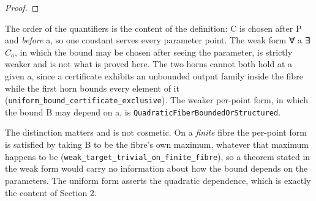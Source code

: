 \begin{proof}
\end{proof}

The order of the quantifiers is the content of the definition: C is chosen after P and \emph{before} a, so one constant serves every parameter point. The weak form ∀ a ∃ $C_{a}$, in which the bound may be chosen after seeing the parameter, is strictly weaker and is not what is proved here. The two horns cannot both hold at a given a, since a certificate exhibits an unbounded output family inside the fibre while the first horn bounds every element of it (\texttt{uniform\_\allowbreak{}bound\_\allowbreak{}certificate\_\allowbreak{}exclusive}). The weaker per-point form, in which the bound B may depend on a, is \texttt{QuadraticFiberBoundedOrStructured}.

The distinction matters and is not cosmetic. On a \emph{finite} fibre the per-point form is satisfied by taking B to be the fibre's own maximum, whatever that maximum happens to be (\texttt{weak\_\allowbreak{}target\_\allowbreak{}trivial\_\allowbreak{}on\_\allowbreak{}finite\_\allowbreak{}fibre}), so a theorem stated in the weak form would carry no information about how the bound depends on the parameters. The uniform form asserts the quadratic dependence, which is exactly the content of Section 2.

